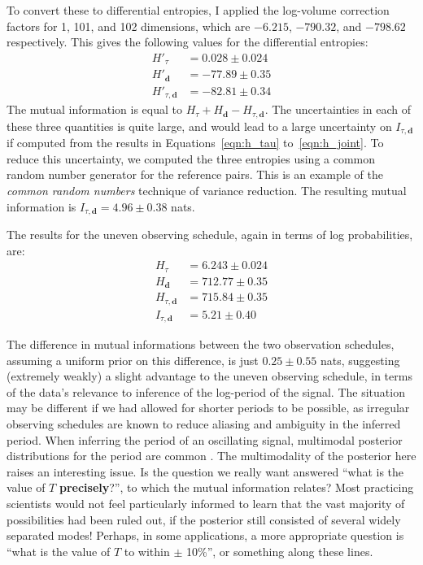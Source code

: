 \documentclass[entropy,article,accept,oneauthor,pdftex,10pt,a4paper]{mdpi}
\renewcommand{\d}{\boldsymbol{d}}
\begin{document}
To convert these to differential entropies, I applied the log-volume
correction factors for 1, 101, and 102 dimensions, which are
$-6.215$, $-790.32$, and $-798.62$ respectively. This gives
the following values for the differential entropies:
\begin{align}
H'_{\tau}     &=  0.028 \pm 0.024 \label{eqn:h_tau}\\
H'_{\d}       &= -77.89 \pm 0.35   \\
H'_{\tau, \d} &= -82.81 \pm 0.34   \label{eqn:h_joint}
\end{align}
The mutual information is equal to $H_{\tau} + H_{\d} - H_{\tau, \d}$. The
uncertainties in each of these three quantities is quite large, and would lead
to a large uncertainty on $I_{\tau, \d}$ if computed from the results
in Equations~\ref{eqn:h_tau} to~\ref{eqn:h_joint}. To reduce this
uncertainty, we computed the three entropies using a common random number
generator for the reference pairs. This is an example of the
{\em common random numbers} technique of variance reduction.
The resulting  mutual information is
$I_{\tau, \d} = 4.96 \pm 0.38$ nats.

The results for the uneven observing schedule, again in terms of log
probabilities, are:
\begin{align}
H_{\tau}     &= 6.243  \pm 0.024 \\
H_{\d}       &= 712.77 \pm 0.35   \\
H_{\tau, \d} &= 715.84 \pm 0.35    \\
I_{\tau, \d} &= 5.21 \pm 0.40
\end{align}

The difference in mutual informations between the two observation
schedules, assuming a uniform prior on this difference,
is just $0.25 \pm 0.55$ nats, suggesting (extremely weakly)
a slight advantage to the
uneven observing schedule, in terms of the data's relevance to inference
of the log-period of the signal. The situation may be different if we
had allowed for shorter periods to be possible, as irregular observing
schedules are known to reduce aliasing and ambiguity in the inferred period.
When inferring the period of an oscillating signal, multimodal posterior
distributions for the period are common \citep{gregoryTrimodal, exoplanet}.
The multimodality of the posterior here raises an interesting issue. Is
the question we really want answered ``what is the value of $T$
{\bf precisely}?'', to which the mutual information relates?
Most practicing scientists would not feel particularly informed to learn
that the vast majority of possibilities had been ruled out, if the
posterior still consisted of several widely separated modes!
Perhaps, in some applications, a more appropriate question is
``what is the value of $T$ to within $\pm$ 10\%'', or something along these
lines.
\end{document}
